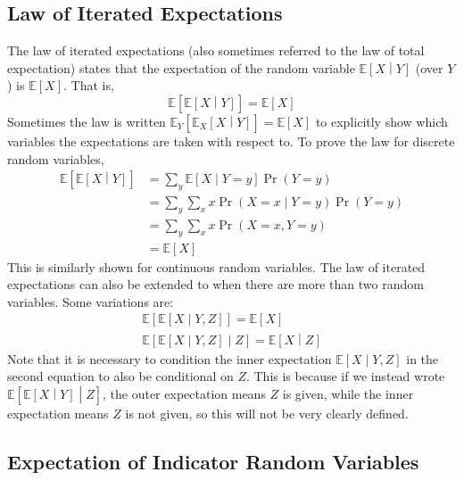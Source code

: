 \documentclass[11pt]{report} %
\begin{document}
\subsection{Law of Iterated Expectations}

The law of iterated expectations (also sometimes referred to the law of total expectation) states that the expectation of the random variable $\mathbb{E}\left[X\middle|Y\right]$ (over $Y$) is $\mathbb{E}\left[X\right]$. That is,
\begin{equation}
\mathbb{E}\left[\mathbb{E}\left[X\middle|Y\right]\right] = \mathbb{E}\left[X\right]
\end{equation}
Sometimes the law is written $\mathbb{E}_{Y}\left[\mathbb{E}_{X}\left[X\middle|Y\right]\right] = \mathbb{E}\left[X\right]$ to explicitly show which variables the expectations are taken with respect to. To prove the law for discrete random variables,
\begin{align}
\mathbb{E}\left[\mathbb{E}\left[X\middle|Y\right]\right] &= \sum_{y}\mathbb{E}\left[X\middle|Y = y\right]\operatorname{Pr}\left(Y = y\right) \\
&= \sum_{y}\sum_{x}x\operatorname{Pr}\left(X = x\middle|Y = y\right)\operatorname{Pr}\left(Y = y\right) \\
&= \sum_{y}\sum_{x}x\operatorname{Pr}\left(X = x, Y = y\right) \\
&= \mathbb{E}\left[X\right]
\end{align}
This is similarly shown for continuous random variables. The law of iterated expectations can also be extended to when there are more than two random variables. Some variations are:
\begin{gather}
\mathbb{E}\left[\mathbb{E}\left[X\middle|Y, Z\right]\right] = \mathbb{E}\left[X\right] \\
\mathbb{E}\left[\mathbb{E}\left[X\middle|Y, Z\right]\middle|Z\right] = \mathbb{E}\left[X\middle|Z\right]
\end{gather}
Note that it is necessary to condition the inner expectation $\mathbb{E}\left[X\middle|Y, Z\right]$ in the second equation to also be conditional on $Z$. This is because if we instead wrote $\mathbb{E}\left[\mathbb{E}\left[X\middle|Y\right]\middle|Z\right]$, the outer expectation means $Z$ is given, while the inner expectation means $Z$ is not given, so this will not be very clearly defined.

\subsection{Expectation of Indicator Random Variables}
\end{document}
